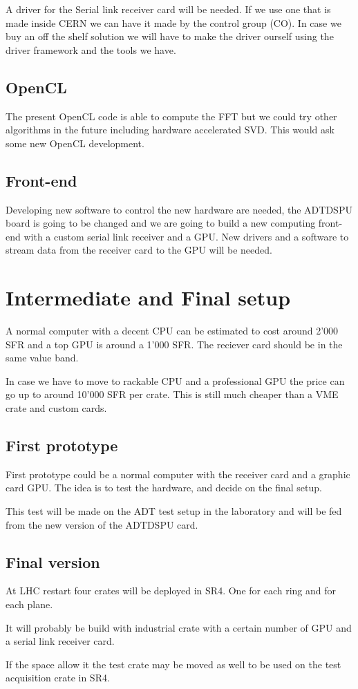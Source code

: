 A driver for the Serial link receiver card will be needed. If we use
one that is made inside \gls{CERN} we can have it made by the control
group (CO). In case we buy an off the shelf solution we will have to
make the driver ourself using the driver framework and the tools we
have.

\subsection{OpenCL}

The present \gls{OpenCL} code is able to compute the \gls{FFT} but we could try other algorithms in the future including hardware accelerated \gls{SVD}. This would ask some new \gls{OpenCL} development.

\subsection{Front-end}

Developing new software to control the new hardware are needed, the \gls{ADTDSPU} board is going to be changed and we are going to build a new computing front-end with a custom serial link receiver and a \gls{GPU}. New drivers and a software to stream data from the receiver card to the \gls{GPU} will be needed.

\section{Intermediate and Final setup}

A normal computer with a decent \gls{CPU} can be estimated to cost around 2'000 SFR and a top \gls{GPU} is around a 1'000 SFR. The reciever card should be in the same value band.

In case we have to move to rackable \gls{CPU} and a professional \gls{GPU} the price can go up to around 10'000 SFR per crate. This is still much cheaper than a \gls{VME} crate and custom cards.

\subsection{First prototype}

First prototype could be a normal computer with the receiver card and a graphic card \gls{GPU}. The idea is to test the hardware, and decide on the final setup.

This test will be made on the \gls{ADT} test setup in the laboratory and will be fed from the new version of the \gls{ADTDSPU} card.

\subsection{Final version}

At \gls{LHC} restart four crates will be deployed in \gls{SR4}. One for each ring and for each plane.

It will probably be build with industrial crate with a certain number of \gls{GPU} and a serial link receiver card. 

If the space allow it the test crate may be moved as well to be used on the test acquisition crate in \gls{SR4}.